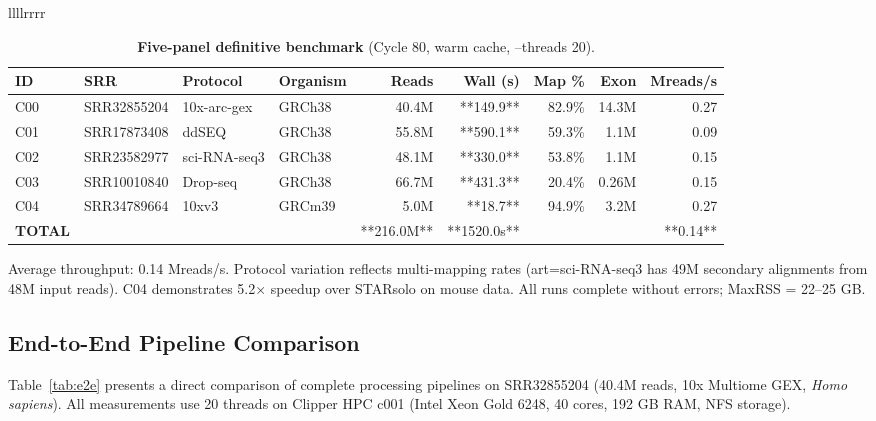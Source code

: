 \documentclass[11pt,a4paper]{article}
\begin{document}
\begin{table}[t]
\begin{tabular}{llllrrrr}
{\begin{table}[t]
\centering
\caption{\textbf{Five-panel definitive benchmark} (Cycle 80, warm cache, --threads 20).}
\label{tab:fivepanel}
\begin{tabular}{llllrrrrr}
\toprule
\textbf{ID} & \textbf{SRR} & \textbf{Protocol} & \textbf{Organism} & \textbf{Reads} & \textbf{Wall (s)} & \textbf{Map \%} & \textbf{Exon} & \textbf{Mreads/s} \\
\midrule
C00 & SRR32855204 & 10x-arc-gex & GRCh38 & 40.4M & **149.9** & 82.9\% & 14.3M & 0.27 \\
C01 & SRR17873408 & ddSEQ & GRCh38 & 55.8M & **590.1** & 59.3\% & 1.1M & 0.09 \\
C02 & SRR23582977 & sci-RNA-seq3 & GRCh38 & 48.1M & **330.0** & 53.8\% & 1.1M & 0.15 \\
C03 & SRR10010840 & Drop-seq & GRCh38 & 66.7M & **431.3** & 20.4\% & 0.26M & 0.15 \\
C04 & SRR34789664 & 10xv3 & GRCm39 & 5.0M & **18.7** & 94.9\% & 3.2M & 0.27 \\
\midrule
\textbf{TOTAL} & & & & **216.0M** & **1520.0s** & & & **0.14** \\
\bottomrule
\end{tabular}
\begin{flushleft}
\footnotesize
Average throughput: 0.14 Mreads/s. Protocol variation reflects multi-mapping rates (art=sci-RNA-seq3 has 49M secondary alignments from 48M input reads). C04 demonstrates 5.2× speedup over STARsolo on mouse data. All runs complete without errors; MaxRSS = 22--25 GB.
\end{flushleft}
\end{table}

\subsection{End-to-End Pipeline Comparison}

Table~\ref{tab:e2e} presents a direct comparison of complete processing pipelines on SRR32855204 (40.4M reads, 10x Multiome GEX, \textit{Homo sapiens}). All measurements use 20 threads on Clipper HPC c001 (Intel Xeon Gold 6248, 40 cores, 192 GB RAM, NFS storage).

}
\end{tabular}
\end{table}
\end{document}
